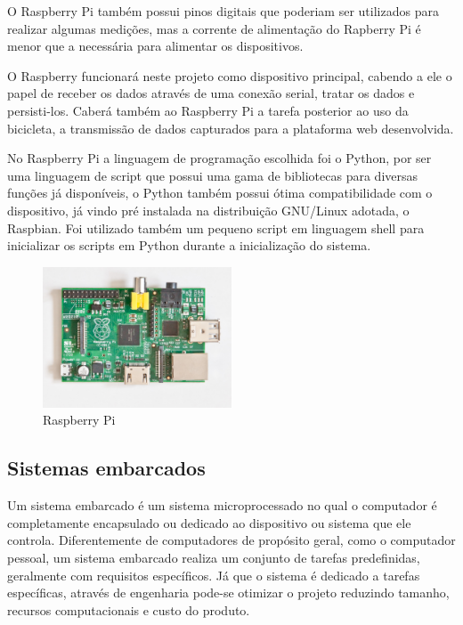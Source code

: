 \documentclass[final,12pt, times, 5p, twocolumn]{elsarticle}
\begin{document}
O Raspberry Pi também possui pinos digitais que poderiam ser utilizados para realizar algumas medições, mas a corrente de alimentação do Rapberry Pi é menor que a necessária para alimentar os dispositivos.

O Raspberry funcionará neste projeto como dispositivo principal, cabendo a ele o papel de receber os dados através de uma conexão serial, tratar os dados e persisti-los. Caberá também ao Raspberry Pi a tarefa posterior ao uso da bicicleta, a transmissão de dados capturados para a plataforma web desenvolvida.

No Raspberry Pi a linguagem de programação escolhida foi o Python, por ser uma linguagem de script que possui uma gama de bibliotecas para diversas funções já disponíveis, o Python também possui ótima compatibilidade com o dispositivo, já vindo pré instalada na distribuição GNU/Linux adotada, o Raspbian. Foi utilizado também um pequeno script em linguagem shell para inicializar os scripts em Python durante a inicialização do sistema. 

\begin{figure}[ht!]
\centering
\includegraphics[width=0.5\textwidth]{pi.jpg}
\caption{\label{fig:pi}Raspberry Pi}
\end{figure}

\subsection{Sistemas embarcados}

Um sistema embarcado é um sistema microprocessado no qual o computador é completamente encapsulado ou dedicado ao dispositivo ou sistema que ele controla. Diferentemente de computadores de propósito geral, como o computador pessoal, um sistema embarcado realiza um conjunto de tarefas predefinidas, geralmente com requisitos específicos. Já que o sistema é dedicado a tarefas específicas, através de engenharia pode-se otimizar o projeto reduzindo tamanho, recursos computacionais e custo do produto.
\end{document}
